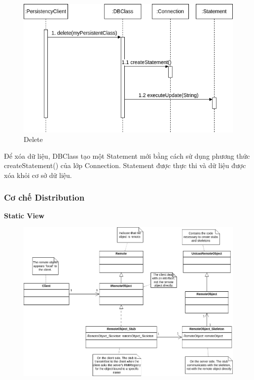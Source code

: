 \begin{figure}[H]
    \centering
    \includegraphics[width=0.9\linewidth]{img3.1.2/design mechanism-Delete.drawio.png}
    \caption{Delete}
\end{figure}
Để xóa dữ liệu, DBClass tạo một Statement mới bằng cách sử dụng phương thức createStatement() của lớp Connection. Statement được thực thi và dữ liệu được xóa khỏi cơ sở dữ liệu.

\subsubsection{Cơ chế Distribution}
\textbf{Static View}
\begin{figure}[H]
    \centering
    \includegraphics[width=\linewidth]{img3.1.2/design mechanism-Distribution.drawio.png}
\end{figure}

